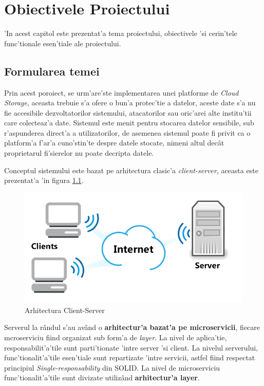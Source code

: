 \documentclass[12pt,a4paper,twoside]{report}
\begin{document}
\newpage

\chapter{Obiectivele Proiectului}
'In acest capitol este prezentat'a tema proiectului, obiectivele 'si cerin'tele func'tionale esen'tiale  ale proiectului.
\section{Formularea temei}
Prin acest poroiect, se urm'are'ste implementarea unei platforme de \textit{Cloud Storage}, aceasta trebuie s'a ofere o bun'a protec'tie a datelor, aceste date s'a nu fie accesibile dezvoltatorilor sistemului, atacatorilor sau oric'arei alte institu'tii care colecteaz'a date. Sistemul este menit pentru stocarea datelor sensibile, sub r'aspunderea direct'a a utilizatorilor, de asemenea sistemul poate fi privit ca o platform'a f'ar'a cuno'stin'te despre datele stocate, nimeni altul decât proprietarul fi'sierelor nu poate decripta datele.

Conceptul sistemului este bazat pe arhitectura clasic'a \textit{client-server}, aceasta este prezentat'a 'in figura \ref{client_server}.

\begin{figure}[H]
\begin{center}
\advance\leftskip-3cm
\advance\rightskip-3cm
\includegraphics[keepaspectratio=true,scale=0.35]{img/client-server.jpeg}
\caption{Arhitectura Client-Server}
\label{client_server}
\end{center}
\end{figure}

Serverul la rândul s'au având o \textbf{arhitectur'a bazat'a pe microservicii}, fiecare mcroserviciu fiind organizat sub form'a de \textit{layer}. La nivel de aplica'tie, responsabilit'a'tile sunt parti'tionate 'intre server 'si client. La nivelul serverului, func'tionalit'a'tile esen'tiale sunt repartizate 'intre servicii, astfel fiind respectat principiul \textit{Single-responsability} din SOLID\cite{solid}. La nivel de microserviciu func'tionalit'a'tile sunt divizate utilizând  \textbf{arhitectur'a layer}.
\end{document}
